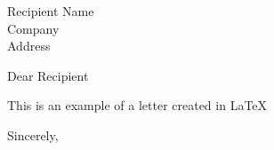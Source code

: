 \documentclass[12pt,a4paper]{letter}
\begin{document}
	\begin{letter}{Recipient Name\\ Company \\ Address}
		\opening{Dear Recipient}
		This is an example of a letter created in \LaTeX
		\closing{Sincerely,}
	\end{letter}
\end{document}
